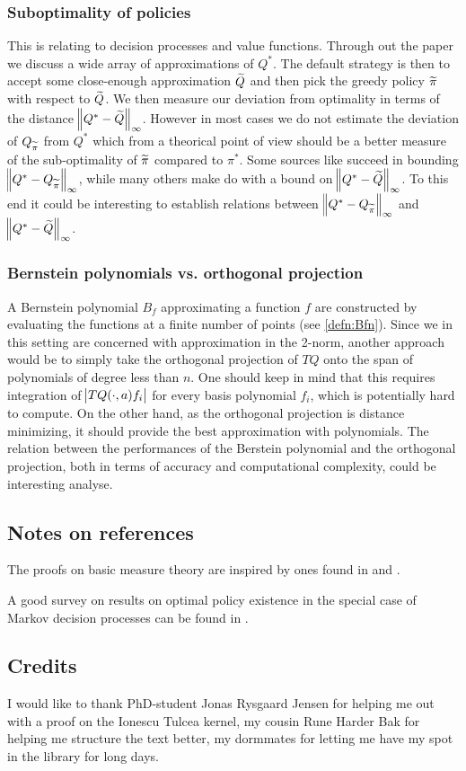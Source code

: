 \subsubsection{Suboptimality of policies}
This is relating to decision processes and value functions.
Through out the paper we discuss a wide array of
approximations of $Q^*$.
The default strategy is then to accept some close-enough approximation $\widetilde{Q}$
and then pick the greedy policy $\widetilde{\pi}$ with respect to $\widetilde{Q}$.
We then measure our deviation from optimality in terms of the distance
$\norm{Q^* - \widetilde{Q}}_\infty$.
However in most cases we do not estimate the deviation of
$Q_{\widetilde{\pi}}$ from $Q^*$ which from a theorical point of view should be
a better measure of the sub-optimality of $\widetilde{\pi}$ compared to $\pi^*$.
Some sources like  succeed in bounding
$\norm{Q^* - Q_{\widetilde{\pi}}}_\infty$,
while many others make do with a bound on $\norm{Q^* - \widetilde{Q}}_\infty$.
To this end it could be interesting to establish relations
between $\norm{Q^* - Q_{\widetilde{\pi}}}_\infty$ and $\norm{Q^* - \widetilde{Q}}_\infty$.

\subsubsection{Bernstein polynomials vs. orthogonal projection}
A Bernstein polynomial $B_f$ approximating a function $f$
are constructed by evaluating the
functions at a finite number of points (see \cref{defn:Bfn}).
Since we in this setting are concerned with approximation in the 2-norm,
another approach would be to simply take the orthogonal projection of
$TQ$ onto the span of polynomials of degree less than $n$.
One should keep in mind that this requires integration of
$\abs{TQ(\cdot, a) f_i}$ for every basis polynomial $f_i$,
which is potentially hard to compute.
On the other hand, as the orthogonal projection is distance minimizing,
it should provide the best approximation with polynomials.
The relation between the performances of the Berstein polynomial
and the orthogonal projection, both in terms of accuracy and 
computational complexity, could be interesting analyse.


\subsection{Notes on references}
The proofs on basic measure theory are inspired by ones found in
 and .

A good survey on results on optimal policy existence in the special case
of Markov decision processes can be found in .

\subsection{Credits}
I would like to thank PhD-student Jonas Rysgaard Jensen for helping me
out with a proof on the Ionescu Tulcea kernel,
my cousin Rune Harder Bak for helping me structure the text better,
my dormmates for letting me have my spot in the library for long days.


